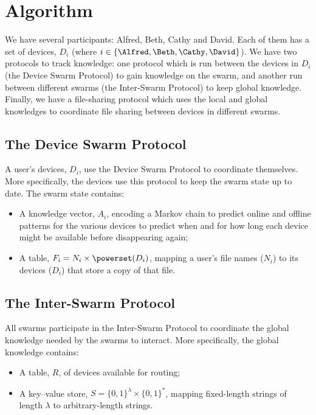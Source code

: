 \section{Algorithm}%
\label{Algorithm}


We have several participants: Alfred, Beth, Cathy and David.
Each of them has a set of devices, \(D_i\) (where \(i\in \{\Alfred, \Beth, \Cathy, 
  \David\}\)).
We have two protocols to track knowledge: one protocol which is run between the 
devices in \(D_i\) (the Device Swarm Protocol) to gain knowledge on the 
swarm, and another run between different swarms (the Inter-Swarm Protocol) to 
keep global knowledge.
Finally, we have a file-sharing protocol which uses the local and global 
knowledges to coordinate file sharing between devices in different swarms.

\subsection{The Device Swarm Protocol}%
\label{DeviceSwarmProtocol}

A user's devices, \(D_i\), use the Device Swarm Protocol to coordinate 
themselves.
More specifically, the devices use this protocol to keep the swarm state up to 
date.
The swarm state contains:
\begin{itemize}
  \item A knowledge vector, \(A_i\), encoding a Markov chain to predict online 
    and offline patterns for the various devices to predict when and for how 
    long each device might be available before disappearing again;
  \item A table, \(F_i = N_i\times \powerset(D_i)\), mapping a user's file names 
    (\(N_i\)) to its devices (\(D_i\)) that store a copy of that file.
\end{itemize}


\subsection{The Inter-Swarm Protocol}%
\label{InterSwarmProtocol}

All swarms participate in the Inter-Swarm Protocol to coordinate the global 
knowledge needed by the swarms to interact.
More specifically, the global knowledge contains:
\begin{itemize}
  \item A table, \(R\), of devices available for routing;
  \item A key--value store, \(S = \{0, 1\}^\lambda\times \{0, 1\}^*\), mapping 
    fixed-length strings of length \(\lambda\) to arbitrary-length strings.
\end{itemize}

